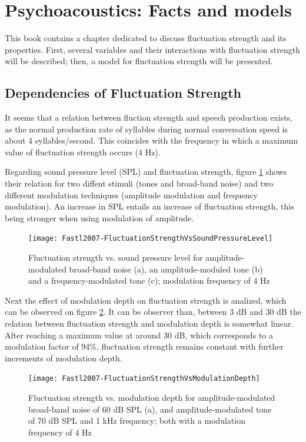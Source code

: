 \section{Psychoacoustics: Facts and models}

This book contains a chapter dedicated to discuss fluctuation strength and its
properties. First, several variables and their interactions with fluctuation
strength will be described; then, a model for fluctuation strength will be
presented.

\subsection{Dependencies of Fluctuation Strength}

It seems that a relation between fluction strength and speech production exists,
as the normal production rate of syllables during normal conversation speed is
about 4 syllables/second. This coincides with the frequency in which a maximum
value of fluctuation strength occurs (4 Hz).

Regarding sound pressure level (SPL) and fluctuation strength, figure
\ref{fig:flucstrenvsndpreslvl} shows their relation for two diffent stimuli
(tones and broad-band noise) and two different modulation techniques (amplitude
modulation and frequency modulation). An increase in SPL entails an increase of
fluctuation strength, this being stronger when using modulation of amplitude.

\begin{figure}
    \centering
    \texttt{[image: Fastl2007-FluctuationStrengthVsSoundPressureLevel]}
    \caption{Fluctuation strength vs. sound pressure level for
        amplitude-modulated broad-band noise (a), an amplitude-moduled tone (b)
        and a frequency-modulated tone (c); modulation frequency of 4 Hz
        \cite[pp. 249]{Fastl2007Psychoacoustics}}
    \label{fig:flucstrenvsndpreslvl}
\end{figure}

Next the effect of modulation depth on fluctuation strength is analized, which
can be observed on figure \ref{fig:flucstrenvsmoddep}. It can be observer than,
between 3 dB and 30 dB the relation between fluctuation strength and modulation
depth is somewhat linear. After reaching a maximum value at around 30 dB, which
corresponds to a modulation factor of 94\%, fluctuation strength remains
constant with further increments of modulation depth.

\begin{figure}
    \centering
    \texttt{[image: Fastl2007-FluctuationStrengthVsModulationDepth]}
    \caption{Fluctuation strength vs. modulation depth for amplitude-modulated
        broad-band noise of 60 dB SPL (a), and amplitude-modulated tone of 70 dB
        SPL and 1 kHz frequency; both with a modulation frequency of 4 Hz
        \cite[pp. 249]{Fastl2007Psychoacoustics}}
    \label{fig:flucstrenvsmoddep}
\end{figure}

